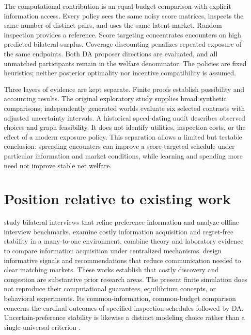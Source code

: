 \documentclass[11pt,a4paper]{article}
\begin{document}
The computational contribution is an equal-budget comparison with explicit information access. Every policy sees the same noisy score matrices, inspects the same number of distinct pairs, and uses the same latent market. Random inspection provides a reference. Score targeting concentrates encounters on high predicted bilateral surplus. Coverage discounting penalizes repeated exposure of the same endpoints. Both DA proposer directions are evaluated, and all unmatched participants remain in the welfare denominator. The policies are fixed heuristics; neither posterior optimality nor incentive compatibility is assumed.

Three layers of evidence are kept separate. Finite proofs establish possibility and accounting results. The original exploratory study supplies broad synthetic comparisons; independently generated worlds evaluate six selected contrasts with adjusted uncertainty intervals. A historical speed-dating audit describes observed choices and graph feasibility. It does not identify utilities, inspection costs, or the effect of a modern exposure policy. This separation allows a limited but testable conclusion: spreading encounters can improve a score-targeted schedule under particular information and market conditions, while learning and spending more need not improve stable net welfare.

\section{Position relative to existing work}
\citet{E01} study bilateral interviews that refine preference information and analyze offline interview benchmarks. \citet{E02} examine costly information acquisition and regret-free stability in a many-to-one environment. \citet{E03} combine theory and laboratory evidence to compare information acquisition under centralized mechanisms. \citet{E04} design informative signals and recommendations that reduce communication needed to clear matching markets. These works establish that costly discovery and congestion are substantive prior research areas. The present finite simulation does not reproduce their computational guarantees, equilibrium concepts, or behavioral experiments. Its common-information, common-budget comparison concerns the cardinal outcomes of specified inspection schedules followed by DA. Uncertain-preference stability is likewise a distinct modeling choice rather than a single universal criterion \citep{E05}.
\end{document}
